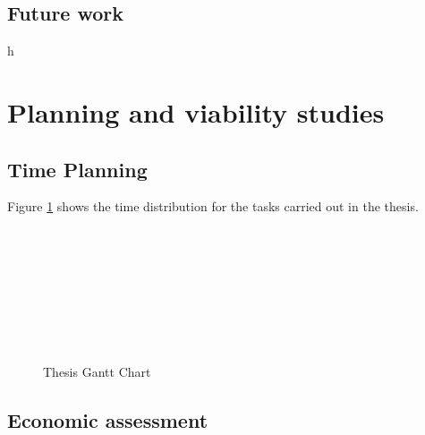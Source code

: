 \documentclass[a4paper,11pt, titlepage, twoside]{article}
\begin{document}
\subsection{Future work}
h
\section{Planning and viability studies}\label{Planning}

\subsection{Time Planning}

Figure \ref{fig:gantt} shows the time distribution for the tasks carried out in the thesis.
\begin{figure}[h]
\begin{center}
\begin{ganttchart}{1}{20}
     \\
         \\
     \\
     \\
     \\
     \\
     \\
\end{ganttchart}
\caption{Thesis Gantt Chart}
\label{fig:gantt}
\end{center}
\end{figure}

\subsection{Economic assessment}
\end{document}
